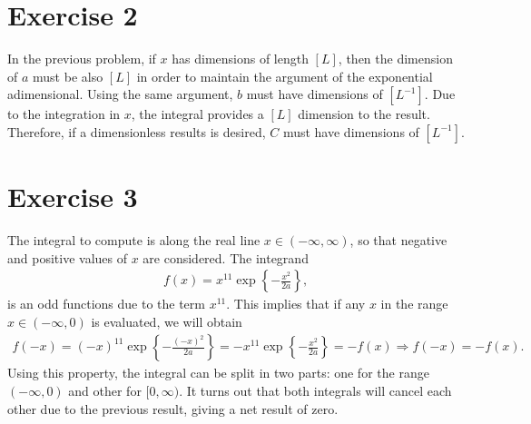 \documentclass[letterpaper,11pt,twoside]{article}
\begin{document}
\section{Exercise 2}
In the previous problem, if $x$ has dimensions of length $[L]$, then the dimension of $a$ must be also $[L]$ in order to maintain the argument of the exponential adimensional.
Using the same argument, $b$ must have dimensions of $[L^{-1}]$. Due to the integration in $x$, the integral provides a $[L]$ dimension to the result. Therefore,
if a dimensionless results is desired, $C$ must have dimensions of $[L^{-1}]$.
\section{Exercise 3}
The integral to compute is along the real line $x\in(-\infty,\infty)$, so that negative and positive values of $x$ are considered.
The integrand
\begin{align*}
  f(x)=x^{11}\exp\left\{-\frac{x^2}{2a}\right\},
\end{align*}
is an odd functions due to the term $x^{11}$. This implies that if any $x$ in the range $x\in(-\infty,0)$ is evaluated, we will obtain
\begin{align*}
  f(-x)=(-x)^{11}\exp\left\{-\frac{(-x)^2}{2a}\right\}=-x^{11}\exp\left\{-\frac{x^2}{2a}\right\}=-f(x)\Longrightarrow f(-x)=-f(x).
\end{align*}
Using this property, the integral can be split in two parts: one for the range $(-\infty,0)$ and other for $[0,\infty)$.
It turns out that both integrals will cancel each other due to the previous result, giving a net result of zero.
\end{document}
